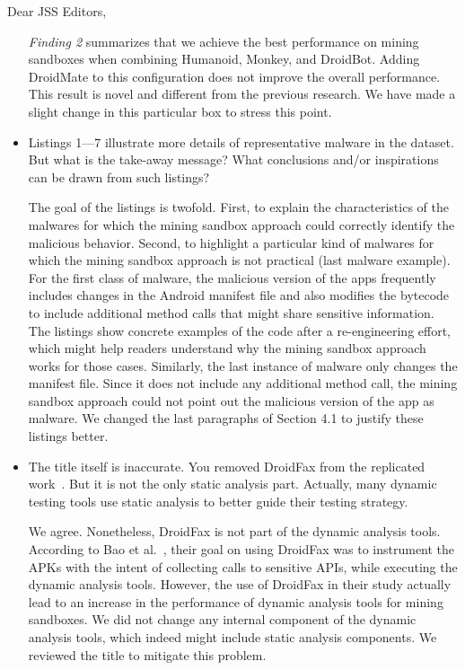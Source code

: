 \documentclass[12pt,english]{scrartcl}
\begin{document}
\begin{letter}{Dear JSS Editors,}
\begin{itemize}
\vspace{0.2cm}

{\color{blue}{\bf Answer.}\emph{Finding 2} summarizes that we achieve the best performance on mining sandboxes when combining Humanoid, Monkey, and DroidBot. Adding DroidMate to this configuration does not improve the overall performance. This result is novel and different from the previous research. We have made a slight change in this particular box to stress this point.}

\vspace{0.2cm}

\item Listings 1---7 illustrate more details of representative malware in the dataset. But what is the take-away message? What 
conclusions and/or inspirations can be drawn from such listings?


\vspace{0.2cm}

{\color{blue}{\bf Answer.}The goal of the listings is twofold. First, to explain the characteristics of the malwares for which the mining sandbox approach could correctly identify the malicious behavior. Second, to highlight a particular kind of malwares for which the mining sandbox approach is not practical (last malware example). For the first class of malware, the malicious version of the apps frequently includes changes in the Android manifest file and also modifies the bytecode to include additional method calls that might share sensitive information. The listings show concrete examples of the code after a re-engineering effort, which might help readers understand why the mining sandbox approach works for those cases. Similarly, the last instance of malware only changes the manifest file. Since it does not include any additional method call, the mining sandbox approach could not point out the malicious version of the app as malware. We changed the last paragraphs of Section 4.1 to justify these listings better.
}

\vspace{0.2cm}

\item The title itself is inaccurate. You removed DroidFax from the replicated work~\cite{DBLP:conf/wcre/BaoLL18}.
  But it is not the only static analysis part. Actually, many dynamic testing tools use
  static analysis to better guide their testing strategy.


\vspace{0.2cm}

{\color{blue}{\bf Answer.} We agree. Nonetheless, DroidFax is not part of the dynamic analysis tools. According to Bao et al.~\cite{jamrozikZ16}, their goal on using DroidFax was to instrument the APKs with the intent of collecting calls to sensitive APIs, while executing the dynamic analysis tools. However, the use of DroidFax in their study actually lead to an increase in the performance of dynamic analysis tools for mining sandboxes. We did not change any internal component of the dynamic analysis tools, which indeed might include static analysis components. We reviewed the title to mitigate this problem.}



\end{itemize}
\end{letter}
\end{document}
